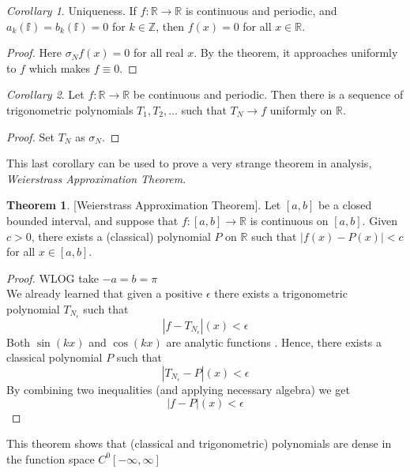 \documentclass{article}
\theoremstyle{remark}
\theoremstyle{lemma}
\theoremstyle{example}
\theoremstyle{proofTrial}
\newtheorem{corollary}{Corollary}
\theoremstyle{definition}
\newtheorem{theorem}{Theorem}
\begin{document}
\begin{corollary}{Uniqueness. \footnotemark{} } If $f : \mathbb{R} \to \mathbb{R}$ is continuous and periodic, and $a_k(\mathbb{f}) = b_k(\mathbb{f}) = 0$ for $k \in \mathbb{Z}$, then $f(x) = 0$ for all $x \in \mathbb{R}$.
\end{corollary}
\begin{proof}
    Here $\sigma_Nf(x) = 0$ for all real $x$. By the theorem, it approaches uniformly to \(f\) which makes $f \equiv 0$.
\end{proof}
\begin{corollary}
    Let $f : \mathbb{R} \rightarrow \mathbb{R}$ be continuous and periodic. Then there is a sequence of trigonometric polynomials $T_1, T_2, \ldots$ such that $T_N \rightarrow f$ uniformly on $\mathbb{R}$.

\end{corollary}
\begin{proof}
    Set $T_N$ as $\sigma_N$.
\end{proof}
This last corollary can be used to prove a very strange theorem in analysis, \textit{Weierstrass Approximation Theorem}.

\begin{theorem}{[Weierstrass Approximation Theorem].} Let $[a, b]$ be a closed bounded interval, and suppose that $f : [a, b] \rightarrow \mathbb{R}$ is continuous on $[a, b]$. Given $c > 0$, there exists a (classical) polynomial $P$ on $\mathbb{R}$ such that $|f(x) - P(x)| < c$ for all $x \in [a, b]$.
\end{theorem}

\begin{proof} WLOG take $-a = b = \pi$\\
    We already learned that given a positive $\epsilon$ there exists a trigonometric polynomial $T_{N_\epsilon}$ such that
    \[
    |f - T_{N_\epsilon}|(x) < \epsilon
    \]
    Both $\sin(kx)$ and $\cos(kx)$ are analytic functions \footnotemark{}
    . Hence, there exists a classical polynomial $P$ such that
    \[
    |T_{N_\epsilon} - P|(x) < \epsilon
    \]
    By combining two inequalities (and applying necessary algebra) we get
    \[
    |f - P|(x) < \epsilon
    \]
\end{proof}
This theorem shows that (classical and trigonometric) polynomials are dense in the function space $C^{0}[-\infty, \infty]$
\end{document}
